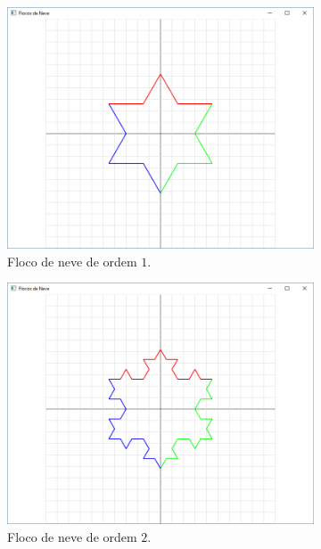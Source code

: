 \begin{renumerate}
\begin{enumerate}[label=(\alph*)]
      \begin{figure}[H]
          \centering
          \begin{subfigure}[t]{0.3\textwidth}
              \centerline{\includegraphics[width=.9\textwidth]{img/cap4_ex15}}
              \caption{Floco de neve de ordem $1$.}
              \label{fig:cap04_ex15a}
          \end{subfigure}
          \hfill
          \begin{subfigure}[t]{0.3\textwidth}
              \centerline{\includegraphics[width=.9\textwidth]{img/cap4_ex15b}}
              \caption{Floco de neve de ordem $2$.}
              \label{fig:cap04_ex15b}
          \end{subfigure}
          \hfill
          \begin{subfigure}[t]{0.3\textwidth}

\end{subfigure}
\end{figure}
\end{enumerate}
\end{renumerate}
